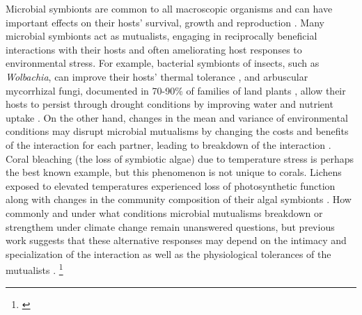 \documentclass[11pt]{article}
\newcommand{\tom}[2]{{\color{red}{#1}}\footnote{\textit{\color{red}{#2}}}}
\begin{document}
Microbial symbionts are common to all macroscopic organisms and can have important effects on their hosts' survival, growth and reproduction \cite{rodriguez2009fungal,mcfall2013animals}.
Many microbial symbionts act as mutualists, engaging in reciprocally beneficial interactions with their hosts and often ameliorating host responses to environmental stress. 
For example, bacterial symbionts of insects, such as \emph{Wolbachia}, can improve their hosts' thermal tolerance \citep{truitt2019wolbachia, renoz2019evolutionary}, and arbuscular mycorrhizal fungi, documented in 70-90\% of families of land plants \citep{parniske2008arbuscular}, allow their hosts to persist through drought conditions by improving water and nutrient uptake \citep{cheng2021elucidating}.
On the other hand, changes in the mean and variance of environmental conditions may disrupt microbial  mutualisms by changing the costs and benefits of the interaction for each partner, leading to breakdown of the interaction \citep{aslan2013mutualism}. 
Coral bleaching (the loss of symbiotic algae) due to temperature stress \citep{sully2019global} is perhaps the best known example, but this phenomenon is not unique to corals.
Lichens exposed to elevated temperatures experienced loss of photosynthetic function along with changes in the community composition of their algal symbionts \citep{meyer2022climate}.
How commonly and under what conditions microbial mutualisms breakdown or strengthem under climate change remain unanswered questions, but previous work suggests that these alternative responses may depend on the intimacy and specialization of the interaction as well as the physiological tolerances of the mutualists \citep{toby2010mutualisms, warren2014mutualism, rafferty2015phenological}. 
\tom{Given that climate change is spatially heterogenous, the rate of change may have a strong influence on when and where we can expect facilitation or disruption of mutualism. }{This is an important sentence that needs some elboration and citation. Can you explain more about spatial heterogeneity in climate change? And are you suggesting that the rate of change itself determines whether mutualism strengthens or breaks down? Also, ``facilitation'' is awkward in this context.}
\end{document}
